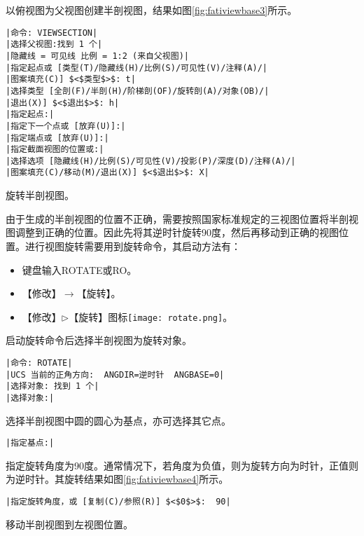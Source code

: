 \begin{procedure}
\item 以俯视图为父视图创建半剖视图，结果如图\ref{fig:fativiewbase3}所示。
\begin{figure}[htbp]
\centering
\begin{floatrow}[2]
\end{floatrow}
\end{figure}
\begin{lstlisting}
|命令: VIEWSECTION|
|选择父视图:找到 1 个|
|隐藏线 = 可见线 比例 = 1:2 (来自父视图)|
|指定起点或 [类型(T)/隐藏线(H)/比例(S)/可见性(V)/注释(A)/|
|图案填充(C)] $<$类型$>$: t|
|选择类型 [全剖(F)/半剖(H)/阶梯剖(OF)/旋转剖(A)/对象(OB)/|
|退出(X)] $<$退出$>$: h|
|指定起点:|
|指定下一个点或 [放弃(U)]:|
|指定端点或 [放弃(U)]:|
|指定截面视图的位置或:|
|选择选项 [隐藏线(H)/比例(S)/可见性(V)/投影(P)/深度(D)/注释(A)/|
|图案填充(C)/移动(M)/退出(X)] $<$退出$>$: X|
\end{lstlisting}
\item 旋转半剖视图。

由于生成的半剖视图的位置不正确，需要按照国家标准规定的三视图位置将半剖视图调整到正确的位置。因此先将其逆时针旋转90度，然后再移动到正确的视图位置。进行视图旋转需要用到旋转命令，其启动方法有：
\begin{itemize}
\item 键盘输入ROTATE或RO。
\item 【修改】$\rightarrow$【旋转】。
\item 【修改】$\triangleright$【旋转】图标\texttt{[image: rotate.png]}。
\end{itemize}

启动旋转命令后选择半剖视图为旋转对象。
\begin{lstlisting}
|命令: ROTATE|
|UCS 当前的正角方向:  ANGDIR=逆时针  ANGBASE=0|
|选择对象: 找到 1 个|
|选择对象:|
\end{lstlisting}
选择半剖视图中圆的圆心为基点，亦可选择其它点。
\begin{lstlisting}
|指定基点:|
\end{lstlisting}
指定旋转角度为90度。通常情况下，若角度为负值，则为旋转方向为时针，正值则为逆时针。其旋转结果如图\ref{fig:fativiewbase4}所示。
\begin{lstlisting}
|指定旋转角度，或 [复制(C)/参照(R)] $<$0$>$:  90|
\end{lstlisting}
\item 移动半剖视图到左视图位置。


\end{procedure}
